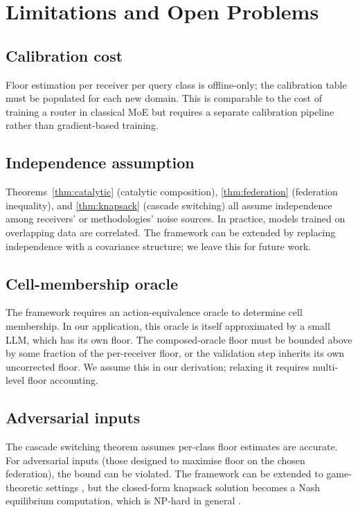 \documentclass[11pt,twocolumn,a4paper]{article}
\theoremstyle{definition}
\theoremstyle{remark}
\begin{document}
\section{Limitations and Open Problems}
\label{sec:limitations}

\subsection{Calibration cost}

Floor estimation per receiver per query class is offline-only; the calibration table must be populated for each new domain. This is comparable to the cost of training a router in classical MoE \citep{shazeer2017outrageously,fedus2022switch} but requires a separate calibration pipeline rather than gradient-based training.

\subsection{Independence assumption}

Theorems~\ref{thm:catalytic} (catalytic composition), \ref{thm:federation} (federation inequality), and \ref{thm:knapsack} (cascade switching) all assume independence among receivers' or methodologies' noise sources. In practice, models trained on overlapping data are correlated. The framework can be extended by replacing independence with a covariance structure; we leave this for future work.

\subsection{Cell-membership oracle}

The framework requires an action-equivalence oracle to determine cell membership. In our application, this oracle is itself approximated by a small LLM, which has its own floor. The composed-oracle floor must be bounded above by some fraction of the per-receiver floor, or the validation step inherits its own uncorrected floor. We assume this in our derivation; relaxing it requires multi-level floor accounting.

\subsection{Adversarial inputs}

The cascade switching theorem assumes per-class floor estimates are accurate. For adversarial inputs (those designed to maximise floor on the chosen federation), the bound can be violated. The framework can be extended to game-theoretic settings \citep{vonneumann1928theorie,nash1951non}, but the closed-form knapsack solution becomes a Nash equilibrium computation, which is NP-hard in general \citep{garey1979computers}.
\end{document}
